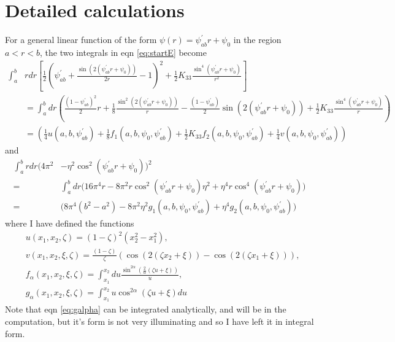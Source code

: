 \documentclass[12pt]{article}
\begin{document}
\section{Detailed calculations}
For a general linear function of the form $\psi(r)=\psi_{ab}^{\prime}r+\psi_0$ in the region $a<r<b$, the two integrals in eqn \ref{eq:startE} become
\begin{align}\label{eq:first_int}
\int_{a}^{b}&rdr\left[\frac{1}{2}\left(\psi_{ab}^{\prime}+\frac{\sin(2(\psi_{ab}^{\prime}r+\psi_0))}{2r}-1\right)^2+\frac{1}{2}K_{33}\frac{\sin^4(\psi_{ab}^{\prime}r+\psi_0)}{r^2}\right]\nonumber\\
&=\int_{a}^{b}dr\left(\frac{(1-\psi_{ab}^{\prime})^2}{2}r+\frac{1}{8}\frac{\sin^2(2(\psi_{ab}^{\prime}r+\psi_0))}{r}-\frac{(1-\psi_{ab}^{\prime})}{2}\sin(2(\psi_{ab}^{\prime}r+\psi_0))+\frac{1}{2}K_{33}\frac{\sin^4(\psi_{ab}^{\prime}r+\psi_0)}{r}\right)\nonumber\\
&=\left(\frac{1}{4}u(a,b,\psi_{ab}^{\prime})+\frac{1}{8}f_1(a,b,\psi_0,\psi_{ab}^{\prime})+\frac{1}{2}K_{33}f_2(a,b,\psi_0,\psi_{ab}^{\prime})+\frac{1}{4}v(a,b,\psi_0,\psi_{ab}^{\prime})\right)
\end{align}
and
\begin{align}\label{eq:second_int}
\int_{a}^{b}rdr\big(4\pi^2&-\eta^2\cos^2(\psi_{ab}^{\prime}r+\psi_0)\big)^2\nonumber\\
=&\int_{a}^{b}dr\big(16\pi^4r-8\pi^2r\cos^2(\psi_{ab}^{\prime}r+\psi_0)\eta^2+\eta^4r\cos^4(\psi_{ab}^{\prime}r+\psi_0)\big)\nonumber\\
=&\big(8\pi^4(b^2-a^2)-8\pi^2\eta^2g_1(a,b,\psi_0,\psi_{ab}^{\prime})+\eta^4g_2(a,b,\psi_0,\psi_{ab}^{\prime})\big)
\end{align}
where I have defined the functions
\begin{subequations}
\begin{align}
&u(x_1,x_2,\zeta)=(1-\zeta)^2(x_2^2-x_1^2),\label{eq:ufunc}\\
&v(x_1,x_2,\xi,\zeta)=\frac{(1-\zeta)}{\zeta}(\cos(2(\zeta x_2+\xi))-\cos(2(\zeta x_1+\xi))),\label{eq:vfunc}\\
&f_{\alpha}(x_1,x_2,\xi,\zeta)=\int_{x_1}^{x_2}du\frac{\sin^{2\alpha}\left(\frac{2}{\alpha}(\zeta u+\xi)\right)}{u},\label{eq:falpha}\\
&g_{\alpha}(x_1,x_2,\xi,\zeta)=\int_{x_1}^{x_2}u\cos^{2\alpha}(\zeta u+\xi)du
\label{eq:galpha}
\end{align}
\end{subequations}
Note that eqn \ref{eq:galpha} can be integrated analytically, and will be in the computation, but it's form is not very illuminating and so I have left it in integral form.
\end{document}
